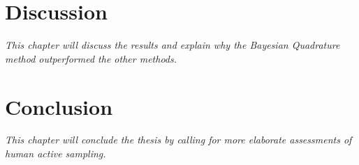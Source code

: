 \documentclass[oneside, 11pt]{book}
\begin{document}
\chapter{Discussion}
\emph{This chapter will discuss the results and explain why the Bayesian Quadrature method outperformed the other methods.}

\chapter{Conclusion}
\emph{This chapter will conclude the thesis by calling for more elaborate assessments of human active sampling.}


{\footnotesize}


\end{document}
